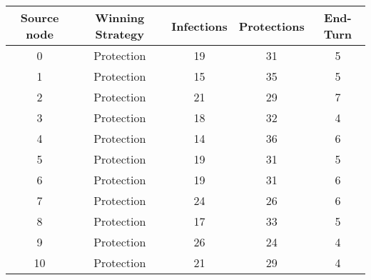 \documentclass[results.tex]{subfiles}
\begin{document}
    \begin{center}
        \begin{tabular}{| c || c | c | c | c |}
            \hline
            {\bfseries Source node} & {\bfseries Winning Strategy} & {\bfseries Infections} & {\bfseries Protections}
            & {\bfseries End-Turn}
            \\  %
            \hline\hline
            0                       & Protection                   & 19                     & 31                      & 5                    \\
            \hline
            1                       & Protection                   & 15                     & 35                      & 5                    \\
            \hline
            2                       & Protection                   & 21                     & 29                      & 7                    \\
            \hline
            3                       & Protection                   & 18                     & 32                      & 4                    \\
            \hline
            4                       & Protection                   & 14                     & 36                      & 6                    \\
            \hline
            5                       & Protection                   & 19                     & 31                      & 5                    \\
            \hline
            6                       & Protection                   & 19                     & 31                      & 6                    \\
            \hline
            7                       & Protection                   & 24                     & 26                      & 6                    \\
            \hline
            8                       & Protection                   & 17                     & 33                      & 5                    \\
            \hline
            9                       & Protection                   & 26                     & 24                      & 4                    \\
            \hline
            10                      & Protection                   & 21                     & 29                      & 4                    \\

\end{tabular}
\end{center}
\end{document}
